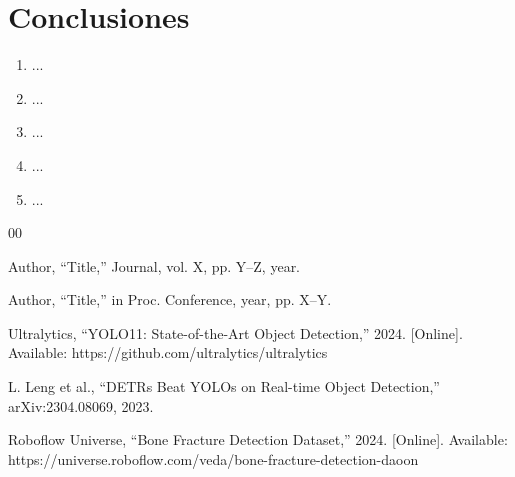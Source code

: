 \documentclass[conference]{IEEEtran}
\begin{document}

\section{Conclusiones}


\begin{enumerate}
    \item ...
    \item ...
    \item ...
    \item ...
    \item ...
\end{enumerate}

\begin{thebibliography}{00}

Author, ``Title,'' Journal, vol. X, pp. Y--Z, year.

Author, ``Title,'' in Proc. Conference, year, pp. X--Y.

Ultralytics, ``YOLO11: State-of-the-Art Object Detection,'' 2024.
[Online]. Available: https://github.com/ultralytics/ultralytics

L. Leng et al., ``DETRs Beat YOLOs on Real-time Object Detection,''
arXiv:2304.08069, 2023.

Roboflow Universe, ``Bone Fracture Detection Dataset,'' 2024.
[Online]. Available: https://universe.roboflow.com/veda/bone-fracture-detection-daoon

\end{thebibliography}
\end{document}
